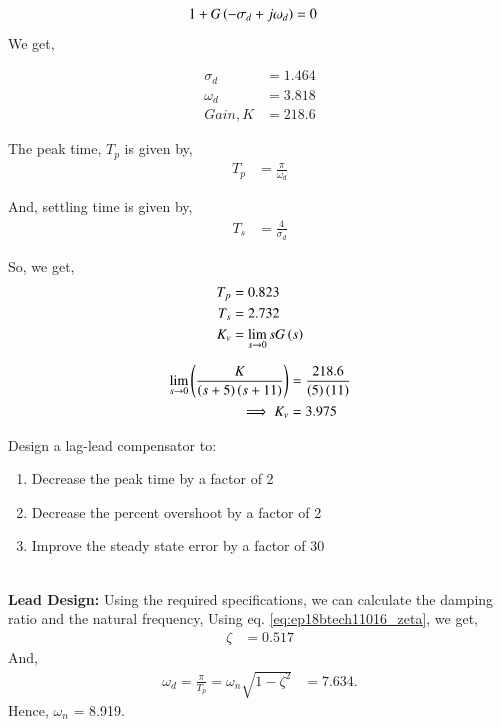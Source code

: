 \begin{align}
    1 + G\left(-\sigma_d + j\omega_d\right) &= 0
\end{align}
We get, 

\begin{align}
    \sigma_d &= 1.464\\
    \omega_d &= 3.818\\
    Gain, K &= 218.6
\end{align}


%

The peak time, $T_p$ is given by,
\begin{align}
    T_p &= \frac{\pi}{\omega_d}
\end{align}

And, settling time is given by,
\begin{align}
    T_s &= \frac{4}{\sigma_d}
\end{align}

So, we get,
\begin{align}
    T_p &= 0.823\\
    T_s &= 2.732\\
    K_v &= \lim_{s \to 0} s G\left(s\right)
\end{align}

\begin{align}
    \lim_{s \to 0} \left(\frac{K}{\left(s+5\right)\left(s+11\right)}\right) &= \frac{218.6}{\left(5\right)\left(11\right)}\\
    \implies K_v &= 3.975
\end{align}


Design a lag-lead compensator to:
\begin{enumerate}
    \item Decrease the peak time by a factor of 2
    \item Decrease the percent overshoot by a factor of 2
    \item Improve the steady state error by a factor  of 30
\end{enumerate}

\solution\\
\textbf{Lead Design:}
Using the required specifications, we can calculate the damping ratio and the natural frequency,
Using eq. \ref{eq:ep18btech11016_zeta}, we get,
\begin{align}
    \zeta &= 0.517
\end{align}
And,
\begin{align}
    \omega_d = \frac{\pi}{T_p} = \omega_n\sqrt{1-\zeta^2} &= 7.634.
\end{align}
Hence, $\omega_n$ = 8.919.


